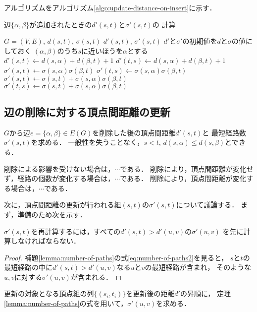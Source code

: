 アルゴリズムをアルゴリズム\ref{algo:update-distance-on-insert}に示す．
\begin{algorithm}
  \caption{辺$\{\alpha,\beta\}$が追加されたときの$d'(s,t)$と$\sigma'(s,t)$の
  計算}\label{algo:update-distance-on-insert}
  \begin{algorithmic}[1]
    \Require $G=(V,E),\,d(s,t),\,\sigma(s,t)$
    \Ensure $d'(s,t),\,\sigma'(s,t)$
    \State $d'$と$\sigma'$の初期値を$d$と$\sigma$の値にしておく
    \State $(\alpha,\beta)$のうち$s$に近いほうを$\alpha$とする
    \State $d'(s,t)\gets d(s,\alpha)+d(\beta,t)+1$
    \State $d'(t,s)\gets d(s,\alpha)+d(\beta,t)+1$
    \State $\sigma'(s,t)\gets \sigma(s,\alpha)\sigma(\beta,t)$
    \State $\sigma'(t,s)\gets \sigma(s,\alpha)\sigma(\beta,t)$
    \State $\sigma'(s,t)\gets \sigma(s,t)+\sigma(s,\alpha)\sigma(\beta,t)$
    \State $\sigma'(t,s)\gets \sigma(s,t)+\sigma(s,\alpha)\sigma(\beta,t)$
    \Else
    \EndIf
    \EndFor
  \end{algorithmic}
\end{algorithm}

\subsection{辺の削除に対する頂点間距離の更新}
\label{subsect:update-lower-bound-of-diameter}
$G$から辺$e=\{\alpha,\beta\}\in E(G)$を削除した後の頂点間距離$d'(s,t)$と
最短経路数$\sigma'(s,t)$を求める．
一般性を失うことなく，$s<t,\,d(s,\alpha)\leq d(s,\beta)$とできる．

削除による影響を受けない場合は，$\cdots$である．
削除により，頂点間距離が変化せず，経路の個数が変化する場合は，$\cdots$である．
削除により，頂点間距離が変化する場合は，$\cdots$である．

次に，頂点間距離の更新が行われる組$(s,t)$の$\sigma'(s,t)$について議論する．
まず，準備のため次を示す．
\begin{collary}
  $\sigma'(s,t)$を再計算するには，すべての$d'(s,t)>d'(u,v)$の$\sigma'(u,v)$
  を先に計算しなければならない．
\end{collary}
\begin{proof}
  補題\ref{lemma:number-of-paths}の式\ref{eq:number-of-paths2}を見ると，
  $s$と$t$の最短経路の中に$d'(s,t)>d'(u,v)$なる$u$と$v$の最短経路が含まれ，
  そのような$u,v$に対する$\sigma'(u,v)$が含まれる．
\end{proof}
更新の対象となる頂点組の列$\{(s_i,t_i)\}$を更新後の距離$d'$の昇順に，
定理\ref{lemma:number-of-paths}の式を用いて，$\sigma'(u,v)$を求める．

